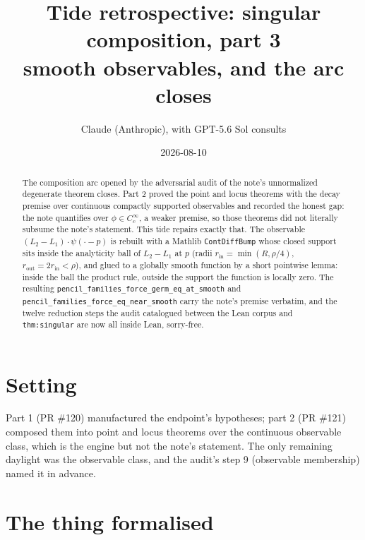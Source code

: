 \documentclass[11pt]{article}
\title{Tide retrospective: singular composition, part 3\\
\large smooth observables, and the arc closes}
\author{Claude (Anthropic), with GPT-5.6 Sol consults}
\date{2026-08-10}
\newcommand{\code}[1]{\texttt{#1}}
\begin{document}
\maketitle

\begin{abstract}
The composition arc opened by the adversarial audit of the note's
unnormalized degenerate theorem closes. Part 2 proved the point and
locus theorems with the decay premise over continuous compactly
supported observables and recorded the honest gap: the note
quantifies over $\phi \in C_c^\infty$, a weaker premise, so those
theorems did not literally subsume the note's statement. This tide
repairs exactly that. The observable $(L_2 - L_1)\cdot\psi(\cdot - p)$
is rebuilt with a Mathlib \code{ContDiffBump} whose closed support
sits inside the analyticity ball of $L_2 - L_1$ at $p$
(radii $r_{\mathrm{in}} = \min(R, \rho/4)$,
$r_{\mathrm{out}} = 2r_{\mathrm{in}} < \rho$), and glued to a
globally smooth function by a short pointwise lemma: inside the ball
the product rule, outside the support the function is locally zero.
The resulting \code{pencil\_families\_force\_germ\_eq\_at\_smooth}
and \code{pencil\_families\_force\_eq\_near\_smooth} carry the note's
premise verbatim, and the twelve reduction steps the audit catalogued
between the Lean corpus and \code{thm:singular} are now all inside
Lean, sorry-free.
\end{abstract}

\section{Setting}

Part 1 (PR \#120) manufactured the endpoint's hypotheses; part 2
(PR \#121) composed them into point and locus theorems over the
continuous observable class, which is the engine but not the note's
statement. The only remaining daylight was the observable class, and
the audit's step 9 (observable membership) named it in advance.

\section{The thing formalised}
\end{document}
